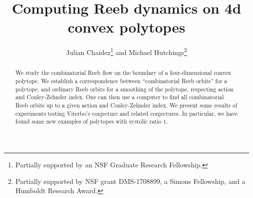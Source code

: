 \documentclass[12pt]{article}
\numberwithin{equation}{section}
\theoremstyle{definition}
\begin{document}
\setcounter{tocdepth}{2}

\title{Computing Reeb dynamics on 4d convex polytopes}
\author{Julian Chaidez\footnote{Partially supported by an NSF Graduate Research Fellowship.}\;  and Michael Hutchings\footnote{Partially supported by NSF grant DMS-1708899, a Simons Fellowship, and a Humboldt Research Award.}}

\maketitle

\begin{abstract} 
We study the combinatorial Reeb flow on the boundary of a four-dimensional convex polytope. We establish a correspondence between ``combinatorial Reeb orbits'' for a polytope, and ordinary Reeb orbits for a smoothing of the polytope, respecting action and Conley-Zehnder index. One can then use a computer to find all combinatorial Reeb orbits up to a given action and Conley-Zehnder index. We present some results of experiments testing Viterbo's conjecture and related conjectures. In particular, we have found some new examples of polytopes with systolic ratio $1$.
\end{abstract}













\begin{appendix}



\end{appendix}
\end{document}
